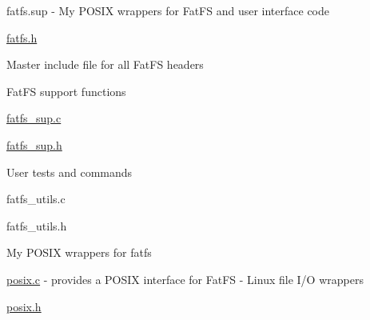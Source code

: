 fatfs.\+sup -\/ My P\+O\+S\+IX wrappers for Fat\+FS and user interface code
\begin{DoxyItemize}
\item \hyperlink{fatfs_8h}{fatfs.\+h}
\begin{DoxyItemize}
\item Master include file for all Fat\+FS headers
\end{DoxyItemize}
\item Fat\+FS support functions
\begin{DoxyItemize}
\item \hyperlink{fatfs__sup_8c}{fatfs\+\_\+sup.\+c}
\item \hyperlink{fatfs__sup_8h}{fatfs\+\_\+sup.\+h}
\end{DoxyItemize}
\item User tests and commands
\begin{DoxyItemize}
\item fatfs\+\_\+utils.\+c
\item fatfs\+\_\+utils.\+h
\end{DoxyItemize}
\item My P\+O\+S\+IX wrappers for fatfs
\begin{DoxyItemize}
\item \hyperlink{posix_8c}{posix.\+c} -\/ provides a P\+O\+S\+IX interface for Fat\+FS -\/ Linux file I/O wrappers
\item \hyperlink{posix_8h}{posix.\+h}
\end{DoxyItemize}
\end{DoxyItemize}

